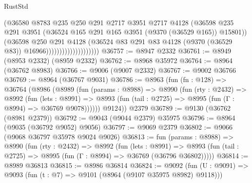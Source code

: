 \begin{lexlean}{RustStd}
\begin{coremodule}
                                      (@36580
                                        @8783
                                        @235
                                        @250
                                        @291
                                        @2717
                                        @3951
                                        @2717
                                        @4128
                                        (@36598
                                          @235
                                          @291
                                          @3951
                                          (@36524
                                            @165
                                            @291
                                            @165
                                            @3951
                                            (@9370 (@36529 @165))
                                            @15801))
                                        (@36598
                                          @250
                                          @291
                                          @4128
                                          (@36524
                                            @83
                                            @291
                                            @83
                                            @4128
                                            (@9370 (@36529 @83))
                                            @16966))))))))))))))))))))
@36757 := @8947 @2332
@36761 := @8949 (@8953 @2332) (@8959 @2332)
@36762 := @8968 @35972
@36764 := @8964 (@36762 @8983)
@36766 := @9006 (@9007 @2332)
@36767 := @9002 @36766
@36769 := @8964 (@36767 @9031)
@36786 := @8963
    (fun (fn : @128) =>
    @36764
      (@8986
        (@8989
          (fun (params : @8988) =>
          @8990
            (fun (rty : @2432) =>
            @8992
              (fun (lets : @8991) =>
              @8993 (fun (tail : @2725) => @8995 (fun (Γ : @8994) => @36769 @9078))))))
        @9124))
    @2379
@36789 := @9130 (@36762 (@8981 @2379))
@36792 := @9043 (@9044 @2379) @35975
@36796 := @8964 (@9035 (@36792 @9052) @9056)
@36797 := @9069 @2379
@36802 := @9066 (@9068 @36797 @35978 @9024 @9026)
@36813 := fun (params : @8988) =>
  @8990
    (fun (rty : @2432) =>
    @8992
      (fun (lets : @8991) =>
      @8993 (fun (tail : @2725) => @8995 (fun (Γ : @8994) => @36769 (@36796 @36802)))))
@36814 := @8989 @36813
@36815 := @8986 @36814
@36824 := @9092
    (fun (U : @9091) => @9093 (fun (t : @7) => @9101 (@8964 (@9107 @35975 @8982) @9118)))

\end{coremodule}
\end{lexlean}
